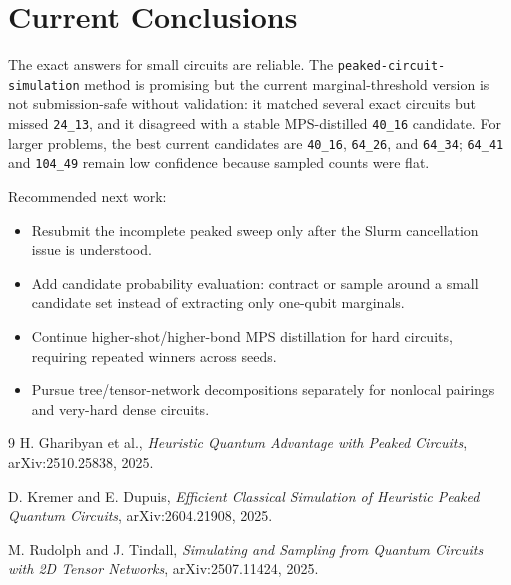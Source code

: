 \documentclass[10pt]{article}
\newcommand{\code}[1]{\texttt{#1}}
\begin{document}


\section{Current Conclusions}
The exact answers for small circuits are reliable.  The \code{peaked-circuit-simulation} method is promising but the current marginal-threshold version is not submission-safe without validation: it matched several exact circuits but missed \code{24\_13}, and it disagreed with a stable MPS-distilled \code{40\_16} candidate.  For larger problems, the best current candidates are \code{40\_16}, \code{64\_26}, and \code{64\_34}; \code{64\_41} and \code{104\_49} remain low confidence because sampled counts were flat.

Recommended next work:
\begin{itemize}
  \item Resubmit the incomplete peaked sweep only after the Slurm cancellation issue is understood.
  \item Add candidate probability evaluation: contract or sample around a small candidate set instead of extracting only one-qubit marginals.
  \item Continue higher-shot/higher-bond MPS distillation for hard circuits, requiring repeated winners across seeds.
  \item Pursue tree/tensor-network decompositions separately for nonlocal pairings and very-hard dense circuits.
\end{itemize}

\begin{thebibliography}{9}
H. Gharibyan et al.,
\emph{Heuristic Quantum Advantage with Peaked Circuits}, arXiv:2510.25838, 2025.

D. Kremer and E. Dupuis,
\emph{Efficient Classical Simulation of Heuristic Peaked Quantum Circuits}, arXiv:2604.21908, 2025.

M. Rudolph and J. Tindall,
\emph{Simulating and Sampling from Quantum Circuits with 2D Tensor Networks}, arXiv:2507.11424, 2025.
\end{thebibliography}
\end{document}
